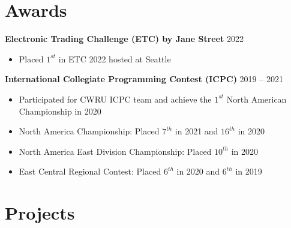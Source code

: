 \documentclass[11pt]{article}
\begin{document}
\section{Awards}

\hspace{10pt}\textbf{Electronic Trading Challenge (ETC) by Jane Street} \hfill {\small 2022}

\begin{itemize}[leftmargin=31pt]
\vspace{-10pt}
\setlength\itemsep{-5pt}
    \item {\small Placed $1^{st}$ in ETC 2022 hosted at Seattle}
    \vspace{-7pt}
\end{itemize}

\hspace{10pt}\textbf{International Collegiate Programming Contest (ICPC)} \hfill {\small 2019 -- 2021}
\begin{itemize}[leftmargin=31pt]
\vspace{-10pt}
\setlength\itemsep{-5pt}
    \item {\small Participated for CWRU ICPC team and achieve the $1^{st}$ North American Championship in 2020}
    \item {\small North America Championship: Placed $7^{th}$ in 2021 and $16^{th}$ in 2020}
    \item {\small North America East Division Championship: Placed $10^{th}$ in 2020}
    \item {\small East Central Regional Contest: Placed $6^{th}$ in 2020 and $6^{th}$ in 2019}
    \vspace{-7pt}
\end{itemize}

\section{Projects}

\end{document}
